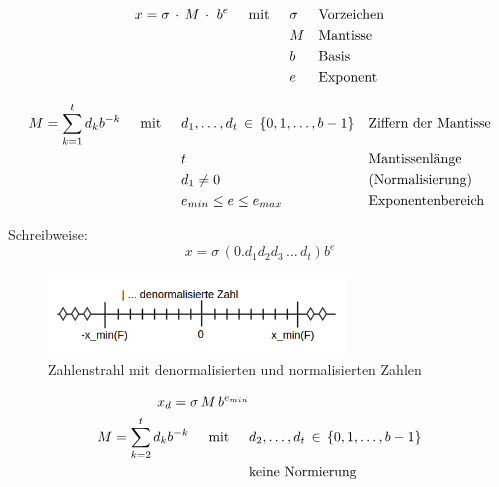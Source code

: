\begin{align*}
x = \sigma\,\cdot\,M\,\cdot\,\,b^e \hspace{0.5cm} \text{mit} \hspace{0.5cm} & \sigma && \text{Vorzeichen}\\
& M && \text{Mantisse} \\
& b && \text{Basis} \\
& e && \text{Exponent}
\end{align*}

\begin{align*}
M = \sum^t_{k=1} d_k b^{-k} \hspace{0.5cm} \text{mit} \hspace{0.5cm} & d_1,\ldots,d_t\, \in\,\{0,1,\ldots,b-1\} && \text{Ziffern der Mantisse}\\
& t && \text{Mantissenlänge} \\
& d_1 \neq 0 && \text{(Normalisierung)} \\
& e_{min} \leq e \leq e_{max} && \text{Exponentenbereich}
\end{align*}

Schreibweise:
\begin{equation*}
x = \sigma\,(0.d_1d_2d_3\,\ldots\,d_t)b^e
\end{equation*}

\begin{figure}[htbp]
  \centering
  \includegraphics[width=0.7\textwidth]{figures/denormalisiertezahlen.png}
  \caption{Zahlenstrahl mit denormalisierten und normalisierten Zahlen}
  \label{fig:denormalisiert}
\end{figure}

\begin{align*}
x_d = \sigma\,M\,b^{e_{min}} &\\
M = \sum^t_{k=2} d_k b^{-k} \hspace{0.5cm} \text{mit} \hspace{0.5cm} & d_2,\ldots,d_t\, \in\,\{0,1,\ldots,b-1\} \\
& \text{keine Normierung} 
\end{align*}


